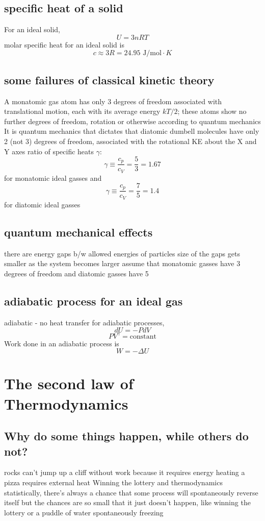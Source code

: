 \documentclass[twocolumn]{article}
\begin{document}
\subsection{specific heat of a solid}
\begin{outline}
\1 For an ideal solid, \[U=3nRT\]
\1 molar specific heat for an ideal solid is \[c\approx3R=24.95\text{ J/mol}\cdot K\]
\end{outline}
\subsection{some failures of classical kinetic theory}
\begin{outline}
\1 A monatomic gas atom has only 3 degrees of freedom associated with translational motion, each with its average energy $kT/2$; these atoms show no further degrees of freedom, rotation or otherwise according to quantum mechanics
\1 It is quantum mechanics that dictates that diatomic dumbell molecules have only 2 (not 3) degrees of freedom, associated with the rotational KE about the X and Y axes
\1 ratio of specific heats $\gamma$: \[\gamma\equiv\dfrac{c_p}{c_V}=\dfrac{5}{3}=1.67\] for monatomic ideal gasses and \[\gamma\equiv\dfrac{c_p}{c_V}=\dfrac{7}{5}=1.4\] for diatomic ideal gasses
\end{outline}
\subsection{quantum mechanical effects}
\begin{outline}
\1 there are energy gaps b/w allowed energies of particles
\1 size of the gaps gets smaller as the system becomes larger
\1 assume that monatomic gasses have 3 degrees of freedom and diatomic gasses have 5
\end{outline}
\subsection{adiabatic process for an ideal gas}
\begin{outline}
\1 adiabatic - no heat transfer
\1 for adiabatic processes, \[dU=-PdV\]
\0 \[PV^\gamma=\text{constant}\]
\1 Work done in an adiabatic process is \[W=-\Delta U\]
\end{outline}
\section{The second law of Thermodynamics}
\subsection{Why do some things happen, while others do not?}
\begin{outline}
\1 rocks can't jump up a cliff without work because it requires energy
\1 heating a pizza requires external heat
\1 Winning the lottery and thermodynamics
\2 statistically, there's always a chance that some process will spontaneously reverse itself but the chances are so small that it just doesn't happen, like winning the lottery or a puddle of water spontaneously freezing
\end{outline}
\end{document}
